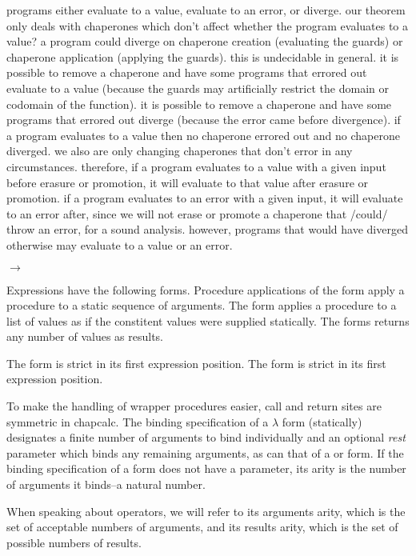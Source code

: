 \documentclass{sigplanconf}
\begin{document}
programs either evaluate to a value, evaluate to an error, or diverge.
our theorem only deals with chaperones which don't affect whether the program evaluates to a value?
a program could diverge on chaperone creation (evaluating the guards) or chaperone application (applying the guards).
this is undecidable in general.
it is possible to remove a chaperone and have some programs that errored out evaluate to a value (because the guards may artificially restrict the domain or codomain of the function).
it is possible to remove a chaperone and have some programs that errored out diverge (because the error came before divergence).
if a program evaluates to a value then no chaperone errored out and no chaperone diverged.
we also are only changing chaperones that don't error in any circumstances.
therefore, if a program evaluates to a value with a given input before erasure or promotion, it will evaluate to that value after erasure or promotion.
if a program evaluates to an error with a given input, it will evaluate to an error after, since we will not erase or promote a chaperone that /could/ throw an error, for a sound analysis.
however, programs that would have diverged otherwise may evaluate to a value or an error.

$\longrightarrow$

Expressions  have the following forms.
Procedure applications of the form  apply a procedure to a static sequence of arguments.
The  form applies a procedure to a list of values as if the constitent values were supplied statically.
The  forms returns any number of values as results. 

The  form is strict in its first expression position.
The  form is strict in its first expression position.

To make the handling of wrapper procedures easier, call and return sites are symmetric in chapcalc. The binding specification of a $\lambda$ form (statically) designates a finite number of arguments to bind individually and an optional \emph{rest} parameter which binds any remaining arguments, as can that of a  or  form. If the binding specification of a form does not have a  parameter, its arity is the number of arguments it binds--a natural number.

When speaking about operators, we will refer to its arguments arity, which is the set of acceptable numbers of arguments, and its results arity, which is the set of possible numbers of results.
\end{document}
